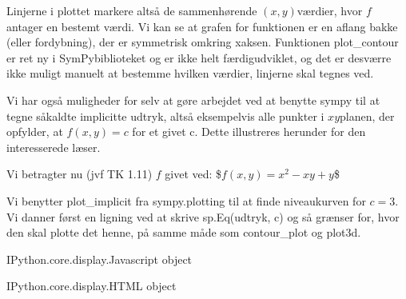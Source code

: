 \documentclass[letterpaper,10pt,english]{jupyterBook}
\begin{document}
Linjerne i plottet markere altså de sammenhørende \((x,y)\)\sphinxhyphen{}værdier, hvor \(f\) antager en bestemt værdi. Vi kan se at grafen for funktionen er en aflang bakke (eller fordybning), der er symmetrisk omkring x\sphinxhyphen{}aksen. Funktionen plot\_contour er ret ny i SymPy\sphinxhyphen{}biblioteket og er ikke helt færdigudviklet, og det er desværre ikke muligt manuelt at bestemme hvilken værdier, linjerne skal tegnes ved.

Vi har også muligheder for selv at gøre arbejdet ved at benytte sympy til at tegne såkaldte implicitte udtryk, altså eksempelvis alle punkter i \(xy\)\sphinxhyphen{}planen, der opfylder, at \(f(x,y) = c\) for et givet c. Dette illustreres herunder for den interesserede læser.

Vi betragter nu (jvf TK 1.11) \(f\) givet ved:
\$\(f(x,y) = x^2 - xy + y\)\$

Vi benytter plot\_implicit fra sympy.plotting til at finde niveaukurven for \(c = 3\). Vi danner først en ligning ved at skrive sp.Eq(udtryk, c) og så grænser for, hvor den skal plotte det henne, på samme måde som contour\_plot og plot3d.

\begin{sphinxVerbatim}[commandchars=\\\{\}]
          

   
       
\end{sphinxVerbatim}

\begin{sphinxVerbatim}[commandchars=\\\{\}]
\PYGZlt{}IPython.core.display.Javascript object\PYGZgt{}
\end{sphinxVerbatim}

\begin{sphinxVerbatim}[commandchars=\\\{\}]
\PYGZlt{}IPython.core.display.HTML object\PYGZgt{}
\end{sphinxVerbatim}
\end{document}

